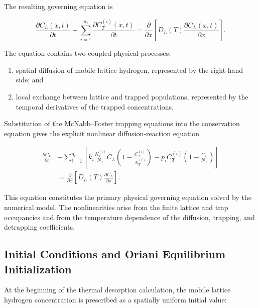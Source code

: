 The resulting governing equation is

\begin{equation}
\frac{\partial C_L(x,t)}{\partial t}
+
\sum_{i=1}^{n_t}
\frac{\partial C_T^{(i)}(x,t)}{\partial t}
=
\frac{\partial}{\partial x}
\left[
D_L(T)
\frac{\partial C_L(x,t)}{\partial x}
\right].
\label{eq:ch3_governing_pde}
\end{equation}

The equation contains two coupled physical processes:

\begin{enumerate}
    \item spatial diffusion of mobile lattice hydrogen, represented by
    the right-hand side; and
    \item local exchange between lattice and trapped populations,
    represented by the temporal derivatives of the trapped
    concentrations.
\end{enumerate}

Substitution of the McNabb--Foster trapping equations into the
conservation equation gives the explicit nonlinear diffusion-reaction
equation

\begin{equation}
\begin{aligned}
\frac{\partial C_L}{\partial t}
&+
\sum_{i=1}^{n_t}
\left[
k_i
\frac{N_T^{(i)}}{N_L}
C_L
\left(
1-\frac{C_T^{(i)}}{N_T^{(i)}}
\right)
-
p_i C_T^{(i)}
\left(
1-\frac{C_L}{N_L}
\right)
\right]
\\
&=
\frac{\partial}{\partial x}
\left[
D_L(T)
\frac{\partial C_L}{\partial x}
\right].
\end{aligned}
\label{eq:ch3_governing_pde_expanded}
\end{equation}

This equation constitutes the primary physical governing equation
solved by the numerical model. The nonlinearities arise from the
finite lattice and trap occupancies and from the temperature
dependence of the diffusion, trapping, and detrapping coefficients.

\subsection{Initial Conditions and Oriani Equilibrium Initialization}
\label{subsec:initial_conditions}

At the beginning of the thermal desorption calculation, the mobile
lattice hydrogen concentration is prescribed as a spatially uniform
initial value:

